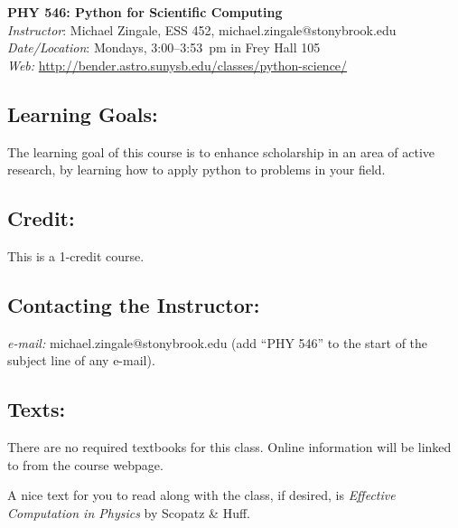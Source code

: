 \documentclass[11pt]{article}
\begin{document}
\begin{center}
{\LARGE \sffamily \bfseries PHY 546: Python for Scientific Computing} \\[3mm]
{\em Instructor}\/: Michael Zingale, ESS 452, michael.zingale@stonybrook.edu \\
{\em Date/Location}\/: Mondays, 3:00--3:53~pm in Frey Hall 105 \\
{\em Web:}\/ \url{http://bender.astro.sunysb.edu/classes/python-science/}
\end{center}

\subsection*{Learning Goals:} 

The learning goal of this course is to enhance scholarship in an area
of active research, by learning how to apply python to problems
in your field.


\subsection*{Credit:} 

This is a 1-credit course.


\subsection*{Contacting the Instructor:} 

{\em e-mail:} michael.zingale@stonybrook.edu ({add ``PHY 546'' to the
 start of the subject line of any e-mail}).
%



\subsection*{Texts:} 

There are no required textbooks for this class.  Online information
will be linked to from the course webpage.

A nice text for you to read along with the class, if desired, is 
{\em Effective Computation in Physics}\/ by Scopatz \& Huff.
\end{document}
